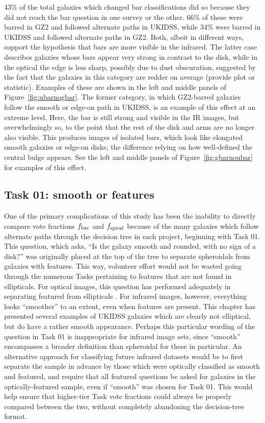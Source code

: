 43\% of the total galaxies which changed bar classifications did so because they did not reach the bar question in one survey or the other. 66\% of these were barred in GZ2 and followed alternate paths in UKIDSS, while 34\% were barred in UKIDSS and followed alternate paths in GZ2. Both, albeit in different ways, support the hypothesis that bars are more visible in the infrared. The latter case describes galaxies whose bars appear very strong in contrast to the disk, while in the optical the edge is less sharp, possibly due to dust obscuration, suggested by the fact that the galaxies in this category are redder on average (provide plot or statistic). Examples of these are shown in the left and middle panels of Figure~\ref{fig:ubarnogbar}. The former category, in which GZ2-barred galaxies follow the smooth or edge-on path in UKIDSS, is an example of this effect at an extreme level. Here, the bar is still strong and visible in the IR images, but overwhelmingly so, to the point that the rest of the disk and arms are no longer also visible. This produces images of isolated bars, which look like elongated smooth galaxies or edge-on disks; the difference relying on how well-defined the central bulge appears. See the left and middle panels of Figure~\ref{fig:gbarnoubar} for examples of this effect. 

\subsection{Task 01: smooth or features} 
\label{ssec:smooth}
One of the primary complications of this study has been the inability to directly compare vote fractions $f_{\rm bar}$ and $f_{\rm spiral}$ because of the many galaxies which follow alternate paths through the decision tree in each project, beginning with Task 01. This question, which asks, ``Is the galaxy smooth and rounded, with no sign of a disk?'' was originally placed at the top of the tree to separate spheroidals from galaxies with features. This way, volunteer effort would not be wasted going through the numerous Tasks pertaining to features that are not found in ellipticals. For optical images, this question has performed adequately in separating featured from ellipticals \citet{Willett2013}. For infrared images, however, everything looks ``smoother'' to an extent, even when features are present. This chapter has presented several examples of UKIDSS galaxies which are clearly not elliptical, but do have a rather smooth appearance. Perhaps this particular wording of the question in Task 01 is inappropriate for infrared image sets, since ``smooth'' encompasses a broader definition than spheroidal for these in particular. An alternative approach for classifying future infrared datasets would be to first separate the sample in advance by those which were optically classified as smooth and featured, and require that all featured questions be asked for galaxies in the optically-featured sample, even if ``smooth'' was chosen for Task 01. This would help ensure that higher-tier Task vote fractions could always be properly compared between the two, without completely abandoning the decision-tree format.   


